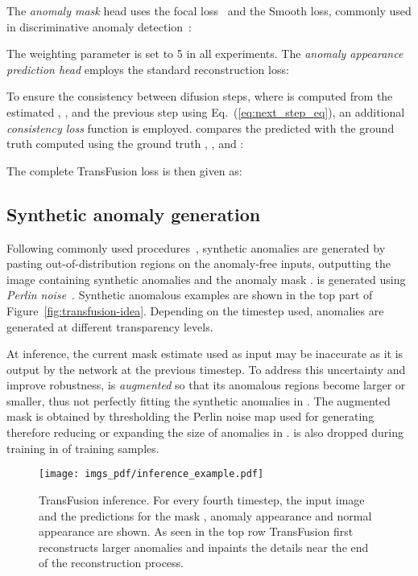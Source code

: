 \documentclass[10pt,twocolumn,letterpaper]{article}
\begin{document}
The \textit{anomaly mask} head uses the focal loss~\cite{focal} and the Smooth  loss, commonly used in discriminative anomaly detection~\cite{memseg,draem}:

The weighting parameter  is set to 5 in all experiments.
The \textit{anomaly appearance prediction head} employs the standard  reconstruction loss:


To ensure the consistency between difusion steps, where  is computed from the estimated , ,  and the previous step  using Eq.~(\ref{eq:next_step_eq}), an additional \textit{consistency loss} function  is employed.  compares the predicted  with the ground truth  computed using the ground truth , , and :

The complete TransFusion loss is then given as:




\subsection{Synthetic anomaly generation}
\label{ch:synt_anom}

Following commonly used procedures~\cite{draem,memseg}, synthetic anomalies are generated by pasting out-of-distribution regions on the anomaly-free inputs, outputting the image containing synthetic anomalies  and the anomaly mask .  is generated using \textit{Perlin noise}~\cite{perlin1985image}. Synthetic anomalous examples are shown in the top part of Figure~\ref{fig:transfusion-idea}. Depending on the timestep used, anomalies are generated at different transparency levels. 


At inference, the current mask estimate  used as input may be inaccurate as it is output by the network at the previous timestep. To address this uncertainty and improve robustness,  is \textit{augmented} so that its anomalous regions become larger or smaller, thus not perfectly fitting the synthetic anomalies in . The augmented mask  is obtained by thresholding the Perlin noise map used for generating  therefore reducing or expanding the size of anomalies in .  is also dropped during training in  of training samples.


\begin{figure}[t]
    \centering
    \texttt{[image: imgs\_pdf/inference\_example.pdf]}
    \caption{TransFusion inference. For every fourth timestep, the input image  and the predictions for the mask , anomaly appearance  and normal appearance  are shown. As seen in the top row TransFusion first reconstructs larger anomalies and inpaints the details near the end of the reconstruction process.}
    \label{fig:inference-example}
\end{figure}
\end{document}
